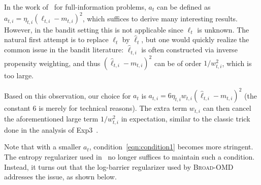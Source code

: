 \documentclass[final, 12pt]{colt2018} %
\newcommand{\inn}[1]{ \langle {#1} \rangle }
\begin{document}
In the work of~\citep{steinhardt2014adaptivity} for full-information problems, $a_t$ can be defined as $a_{t,i} = \eta_{t,i}(\ell_{t,i}-m_{t,i})^2$,
which suffices to derive many interesting results.
However, in the bandit setting this is not applicable since $\ell_t$ is unknown.
The natural first attempt is to replace $\ell_t$ by $\hat{\ell}_t$, but one would quickly realize the common issue in the bandit literature:
$\hat{\ell}_{t,i}$ is often constructed via inverse propensity weighting, and thus $(\hat{\ell}_{t,i}-m_{t,i})^2$ can be of order $1/w_{t,i}^2$, which is too large.

Based on this observation, our choice for $a_t$ is $a_{t,i}=6\eta_{t,i}w_{t,i}(\hat{\ell}_{t,i}-m_{t,i})^2$ (the constant $6$ is merely for technical reasons). 
The extra term $w_{t,i}$ can then cancel the aforementioned large term $1/w_{t,i}^2$ in expectation, similar to the classic trick done in the analysis of Exp3~\citep{auer2002nonstochastic}.



Note that with a smaller $a_t$, condition~\eqref{eqn:condition1} becomes more stringent.
The entropy regularizer used in~\citep{steinhardt2014adaptivity} no longer suffices to maintain such a condition.
Instead, it turns out that the log-barrier regularizer used by \textsc{Broad-OMD} addresses the issue, as shown below.
\end{document}
